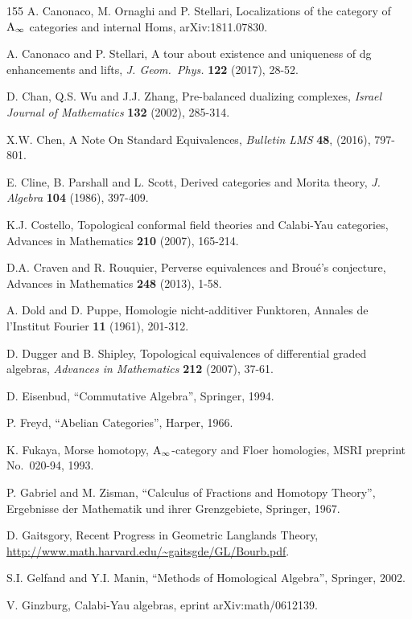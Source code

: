 \begin{thebibliography}{155}
 A. Canonaco, M. Ornaghi and P. Stellari, 
Localizations of the category of $\mathrm{A}_{\infty}$ categories
and internal Homs, 
arXiv:1811.07830.

 A. Canonaco and P. Stellari, 
A tour about existence and uniqueness of dg enhancements and lifts, 
{\em J. Geom.\ Phys.} {\bf 122} (2017), 28-52.

 D. Chan, Q.S. Wu and J.J. Zhang,
Pre-balanced dualizing complexes,
{\em Israel Journal of Mathematics} {\bf 132} (2002), 285-314.

 X.W. Chen,
A Note On Standard Equivalences, 
{\em Bulletin LMS} {\bf 48}, (2016), 797-801.

 E. Cline, B. Parshall and L. Scott, 
Derived categories and Morita theory, 
{\em J. Algebra} {\bf 104} (1986), 397-409.

 K.J. Costello,
Topological conformal field theories and Calabi-Yau categories,
Advances in Mathematics {\bf 210} (2007), 165-214.

 D.A. Craven and R. Rouquier,
Perverse equivalences and Brou\'e's conjecture,
Advances in Mathematics {\bf 248} (2013), 1-58.

 A. Dold and D. Puppe, 
Homologie nicht-additiver Funktoren, 
Annales de l'Institut Fourier {\bf 11} (1961), 201-312.

 D. Dugger and B. Shipley,
Topological equivalences of differential graded algebras,
{\em  Advances in Mathematics} {\bf 212} (2007), 37-61.

 D. Eisenbud,
``Commutative Algebra'', Springer, 1994.

 P. Freyd, 
``Abelian Categories'', Harper, 1966. 

 K. Fukaya, 
Morse homotopy, $\mathrm{A}_{\infty}$-category and Floer homologies, MSRI 
preprint No.\ 020-94, 1993.

 P. Gabriel and M. Zisman, 
``Calculus of Fractions and Homotopy Theory'', Ergebnisse der Mathematik und 
ihrer Grenzgebiete, Springer, 1967.

 D. Gaitsgory,
Recent Progress in Geometric Langlands Theory,  
\url{http://www.math.harvard.edu/~gaitsgde/GL/Bourb.pdf}. 

 S.I. Gelfand and Y.I. Manin, 
``Methods of Homological Algebra'', Springer, 2002.

 V. Ginzburg,
Calabi-Yau algebras, eprint arXiv:math/0612139.


\end{thebibliography}
